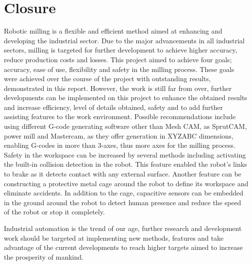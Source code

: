 \documentclass{report}
\begin{document}
	

\section*{Closure}
\bigskip			

Robotic milling is a flexible and efficient method aimed at enhancing and developing the industrial sector. Due to the major advancements in all industrial sectors, milling is targeted for further development to achieve higher accuracy, reduce production costs and losses. This project aimed to achieve four goals; accuracy, ease of use, flexibility and safety in the milling process. These goals were achieved over the course of the project with outstanding results, demonstrated in this report. 
\medskip			
However, the work is still far from over, further developments can be implemented on this project to enhance the obtained results and increase efficiency, level of details obtained, safety and to add further assisting features to the work environment. 
Possible recommendations include using different G-code generating software other than Mesh CAM, as SprutCAM, power mill and Mastercam, as they offer generation in XYZABC dimensions, enabling G-codes in more than 3-axes, thus more axes for the milling process. Safety in the workspace can be increased by several methods including activating the built-in collision detection in the robot. This feature enabled the robot’s links to brake as it detects contact with any external surface. Another feature can be constructing a protective metal cage around the robot to define its workspace and eliminate accidents. In addition to the cage, capacitive sensors can be embedded in the ground around the robot to detect human presence and reduce the speed of the robot or stop it completely.


\medskip Industrial automation is the trend of our age, further research and development work should be targeted at implementing new methods, features and take advantage of the current developments to reach higher targets aimed to increase the prosperity of mankind.  
\end{document}
